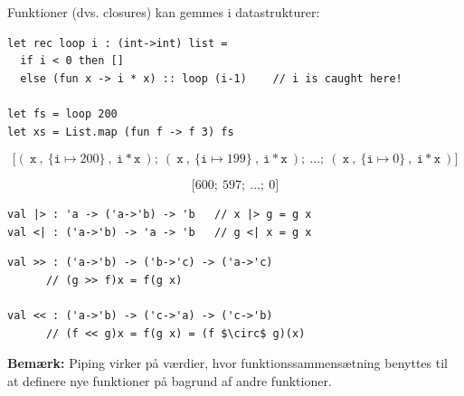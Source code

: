 \documentclass[rgb]{beamer}
\begin{document}
\begin{frame}[fragile]
\begin{footnotesize}


  Funktioner (dvs. closures) kan gemmes i datastrukturer:

\begin{lstlisting}[numbers=none,frame=none,mathescape]
let rec loop i : (int->int) list =
  if i < 0 then []
  else (fun x -> i * x) :: loop (i-1)    // i is caught here!

let fs = loop 200
let xs = List.map (fun f -> f 3) fs
\end{lstlisting}


$$\mathtt{[}(~\mathtt{x}~, ~\{\mathtt{i} \mapsto 200\}~, ~\mathtt{i*x}~);~ (~\mathtt{x}~, ~\{\mathtt{i} \mapsto 199\}~, ~\mathtt{i*x}~); ~...;~(~\mathtt{x}~, ~\{\mathtt{i} \mapsto 0\}~, ~\mathtt{i*x}~)\mathtt{]}$$


$$\mathtt{[}600;~ 597; ~...;~0\mathtt{]}$$
\end{footnotesize}
\end{frame}

\begin{frame}[fragile]
\begin{small}


\begin{lstlisting}[numbers=none,frame=none,mathescape]
val |> : 'a -> ('a->'b) -> 'b   // x |> g = g x
val <| : ('a->'b) -> 'a -> 'b   // g <| x = g x
\end{lstlisting}


\begin{lstlisting}[numbers=none,frame=none,mathescape]
val >> : ('a->'b) -> ('b->'c) -> ('a->'c)
      // (g >> f)x = f(g x)

val << : ('a->'b) -> ('c->'a) -> ('c->'b)
      // (f << g)x = f(g x) = (f $\circ$ g)(x)
\end{lstlisting}

\textbf{Bemærk:} Piping virker på værdier, hvor funktionssammensætning
benyttes til at definere nye funktioner på bagrund af andre funktioner.

\end{small}
\end{frame}
\end{document}
